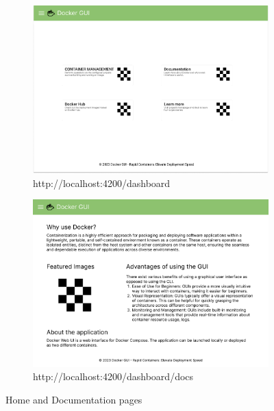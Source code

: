 \documentclass[multi, tikz, a4paper, oneside]{article}
\begin{document}
\begin{figure}[h]
  \centering
  \begin{subfigure}{.5\textwidth}
    \centering
    \includegraphics[width=.95\linewidth]{diagrams/2.homepage.pdf}
    \caption{http://localhost:4200/dashboard}
    \label{fig:sub1}
  \end{subfigure}%
  \begin{subfigure}{.5\textwidth}
    \centering
    \includegraphics[width=.95\linewidth]{diagrams/5.docs.pdf}
    \caption{http://localhost:4200/dashboard/docs}
    \label{fig:sub2}
  \end{subfigure}
  \caption{Home and Documentation pages}
  \label{fig:figma2}
\end{figure}
\end{document}
